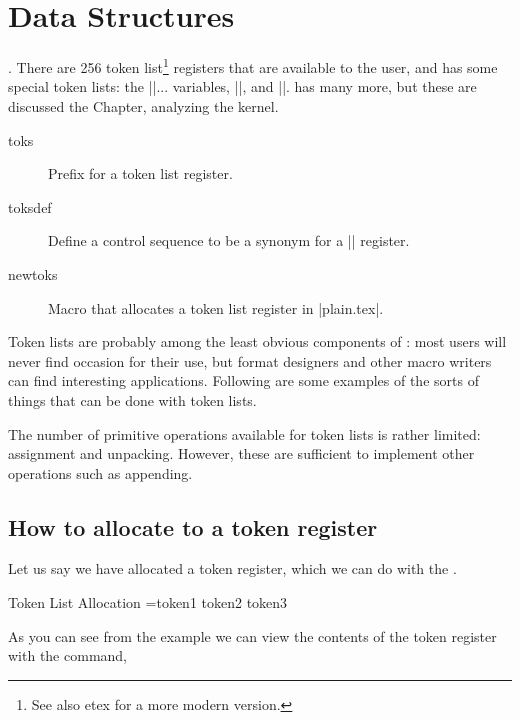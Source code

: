 \chapter{Data Structures}

. There are 256 token list\footnote{See also etex for a more modern version.} registers that are
available to the user, and \tex has some special token lists: the |\every|... variables, |\errhelp|,
and |\output|. \latex has many more, but these are discussed the Chapter, analyzing the \latex kernel.

\begin{description}
\item [toks] Prefix for a token list register.
\item [toksdef]  Define a control sequence to be a synonym for a |\toks| register.
\item [newtoks] Macro that allocates a token list register in |plain.tex|.

\end{description}


Token lists are probably among the least obvious components of \tex: most \tex users will never
find occasion for their use, but format designers and other macro writers can find interesting
applications. Following are some examples of the sorts of things that can be done with token lists.

The number of primitive operations available for token lists is rather limited: assignment and
unpacking. However, these are sufficient to implement other operations such as appending.

\section{How to allocate to a token register}

\begin{macro}{\newtoks}
Let us say we have allocated a token register, which we can do with the .
\end{macro}


\begin{texexample}{Token List Allocation}{}
\newtoks\alist
\alist={token1 token2 token3}
\the\alist
\end{texexample}

As you can see from the example we can view the contents of the token register with the  command,

